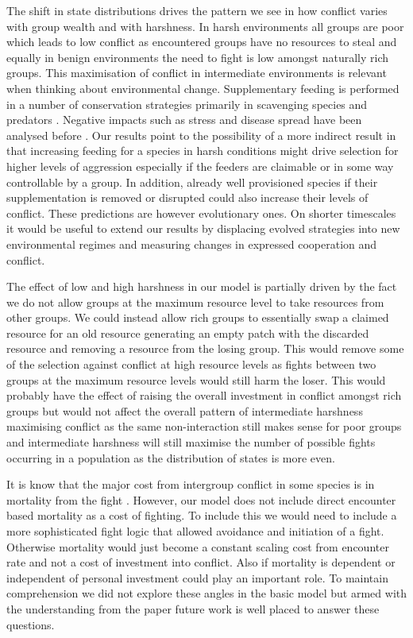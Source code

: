 The shift in state distributions drives the pattern we see in how conflict varies with group wealth and with harshness. In harsh environments all groups are poor which leads to low conflict as encountered groups have no resources to steal and equally in benign environments the need to fight is low amongst naturally rich groups. This maximisation of conflict in intermediate environments is relevant when thinking about environmental change. Supplementary feeding is performed in a number of conservation strategies primarily in scavenging species and predators \citep{oroTestingGoodness2008}. Negative impacts such as stress and disease spread have been analysed before \citep{murrayWildlifeHealth2016}. Our results point to the possibility of a more indirect result in that increasing feeding for a species in harsh conditions might drive selection for higher levels of aggression especially if the feeders are claimable or in some way controllable by a group. In addition, already well provisioned species if their supplementation is removed or disrupted could also increase their levels of conflict. These predictions are however evolutionary ones. On shorter timescales it would be useful to extend our results by displacing evolved strategies into new environmental regimes and measuring changes in expressed cooperation and conflict. 

The effect of low and high harshness in our model is partially driven by the fact we do not allow groups at the maximum resource level to take resources from other groups. We could instead allow rich groups to essentially swap a claimed resource for an old resource generating an empty patch with the discarded resource and removing a resource from the losing group. This would remove some of the selection against conflict at high resource levels as fights between two groups at the maximum resource levels would still harm the loser. This would probably have the effect of raising the overall investment in conflict amongst rich groups but would not affect the overall pattern of intermediate harshness maximising conflict as the same non-interaction still makes sense for poor groups and intermediate harshness will still maximise the number of possible fights occurring in a population as the distribution of states is more even. 

It is know that the major cost from intergroup conflict in some species is in mortality from the fight \cite{cantBandedMongooses2016}. However, our model does not include direct encounter based mortality as a cost of fighting. To include this we would need to include a more sophisticated fight logic that allowed avoidance and initiation of a fight. Otherwise mortality would just become a constant scaling cost from encounter rate and not a cost of investment into conflict. Also if mortality is dependent or independent of personal investment could play an important role. To maintain comprehension we did not explore these angles in the basic model but armed with the understanding from the paper future work is well placed to answer these questions.

